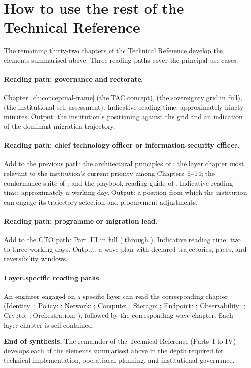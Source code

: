\section{How to use the rest of the Technical Reference}
\label{sec:synth-using}

The remaining thirty-two chapters of the Technical Reference
develop the elements summarised above. Three reading paths cover
the principal use cases.

\paragraph{Reading path: governance and rectorate.}
Chapter~\ref{ch:conceptual-frame} (the TAC concept),
 (the sovereignty grid in full),
 (the institutional self-assessment).
Indicative reading time: approximately ninety minutes. Output:
the institution's positioning against the grid and an indication
of the dominant migration trajectory.

\paragraph{Reading path: chief technology officer or
information-security officer.} Add to the previous path: the
architectural principles of ;
the layer chapter most relevant to the institution's current
priority among Chapters~6--14; the conformance suite of
; and the playbook reading guide of
. Indicative reading time:
approximately a working day. Output: a position from which the
institution can engage its trajectory selection and procurement
adjustments.

\paragraph{Reading path: programme or migration lead.} Add to the
CTO path: Part~III in full
( through
). Indicative reading time:
two to three working days. Output: a wave plan with declared
trajectories, paces, and reversibility windows.

\paragraph{Layer-specific reading paths.} An engineer engaged
on a specific layer can read the corresponding chapter (Identity:
; Policy: ; Network:
; Compute: ; Storage:
; Endpoint: ;
Observability: ; Crypto:
; Orchestration: ),
followed by the corresponding wave chapter. Each layer chapter
is self-contained.

\medskip

\noindent \textbf{End of synthesis.} The remainder of the Technical
Reference (Parts~I to IV) develops each of the elements summarised
above in the depth required for technical implementation,
operational planning, and institutional governance.

